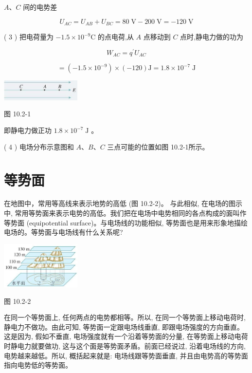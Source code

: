\documentclass[10pt]{article}
\begin{document}
\(A\text{、}C\) 间的电势差

\[
{U}_{AC} = {U}_{AB} + {U}_{BC} = {80}\mathrm{\;V} - {200}\mathrm{\;V} = - {120}\mathrm{\;V}
\]

( 3 ) 把电荷量为 \(- {1.5} \times {10}^{-9}\mathrm{C}\) 的点电荷,从 \(A\) 点移动到 \(C\) 点时,静电力做的功为

\[
{W}_{AC} = {q}^{\prime }{U}_{AC}
\]

\[
= \left( {-{1.5} \times {10}^{-9}}\right) \times \left( {-{120}}\right) \mathrm{J} = {1.8} \times {10}^{-7}\mathrm{\;J}
\]

\begin{center}
\includegraphics[max width=0.3\textwidth]{images/01911d5f-8e38-70c0-b5b8-2b399bd115b6_38_474709.jpg}
\end{center}

图 10.2-1

即静电力做正功 \({1.8} \times {10}^{-7}\mathrm{\;J}\) 。

( 4 ) 电场分布示意图和 \(A\text{、}B\text{、}C\) 三点可能的位置如图 10.2-1所示。

\section*{等势面}

在地图中，常用等高线来表示地势的高低 (图 10.2-2)。 与此相似, 在电场的图示中, 常用等势面来表示电势的高低。我们把在电场中电势相同的各点构成的面叫作等势面 (equipotential surface)。与电场线的功能相似, 等势面也是用来形象地描绘电场的。等势面与电场线有什么关系呢?

\begin{center}
\includegraphics[max width=0.3\textwidth]{images/01911d5f-8e38-70c0-b5b8-2b399bd115b6_38_815846.jpg}
\end{center}

图 10.2-2

在同一个等势面上, 任何两点的电势都相等。所以, 在同一个等势面上移动电荷时, 静电力不做功。由此可知, 等势面一定跟电场线垂直, 即跟电场强度的方向垂直。这是因为, 假如不垂直, 电场强度就有一个沿着等势面的分量, 在等势面上移动电荷时静电力就要做功, 这与这个面是等势面矛盾。前面已经说过, 沿着电场线的方向, 电势越来越低。所以, 概括起来就是: 电场线跟等势面垂直, 并且由电势高的等势面指向电势低的等势面。
\end{document}
